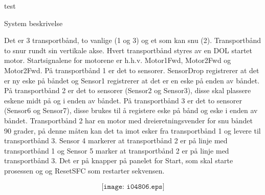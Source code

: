\documentclass[12pt,norsk,a4paper]{book}
\begin{document}
test
%

System beskrivelse

Det er 3 transportbånd, to vanlige (1 og 3) og et som kan snu (2). Transportbånd to snur rundt sin vertikale akse. Hvert transportbånd styres av en DOL startet motor. Startsignalene
for motorene er h.h.v. Motor1Fwd, Motor2Fwd og Motor2Fwd. På transportbånd 1 er det to sensorer. SensorDrop registrerer at det er ny eske på båndet og Sensor1 registrerer at det er en eske på enden av båndet. På transportbånd 2 er det to sensorer (Sensor2 og Sensor3), disse skal plassere eskene midt på og i enden av båndet. På transportbånd 3 er det to sensorer (Sensor6 og Sensor7), disse brukes til å registere eske på bånd og eske i enden av båndet. Transportbånd 2 har en motor med dreieretningsvender for snu båndet 90 grader, på denne måten kan det ta imot esker fra transportbånd 1 og levere til transportbånd 3. Sensor 4 markerer at transportbånd 2 er på linje med transportbånd 1 og Sensor 5 marker at transportbånd 2 er på linje med transportbånd 3. Det er på knapper på panelet for Start, som skal starte prosessen og og ResetSFC som restarter sekvensen.   

$$\texttt{[image: i04806.eps]}$$
\end{document}
